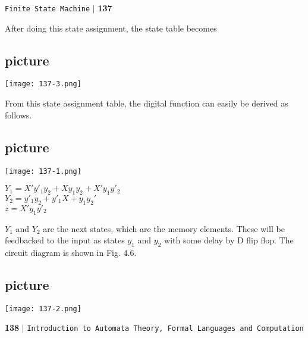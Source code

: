 \documentclass{article}
\begin{document}
\begin{flushright}
\texttt{Finite State Machine} \hspace*{0.10cm}\textbf{$|$} \textbf{137}\hspace*{0.5cm}
\end{flushright}


\vspace*{1cm}
After doing this state assignment, the state table becomes
\begin{center}
\section{picture}
\texttt{[image: 137-3.png]}
\end{center}

From this state assignment table, the digital function can easily be derived as follows.
\begin{center}
\section{picture}
\texttt{[image: 137-1.png]}
\end{center}

\begin{center}
$Y_1 = X'y'_1y_2 + Xy_1y_2 + X'y_1y'_2$\\
$Y_2 = y'_1y_2 + y'_1X + y_1y_2'$\\
$z = X'y_1y'_2$\\
\end{center}

\hspace*{0.2cm} $Y_1$ and $Y_2$ are the next states, which are the memory elements. These will be feedbacked to the input
as states $y_1$ and $y_2$ with some delay by D flip flop. The circuit diagram is shown in Fig. 4.6.


\begin{center}
\section{picture}
\texttt{[image: 137-2.png]}
\end{center}


\begin{flushleft}
    \textbf{138}\hspace*{0.1cm} \textbf{$|$} \hspace*{0.1cm} \texttt{Introduction to Automata Theory, Formal Languages and Computation}
  \end{flushleft}
\end{document}

